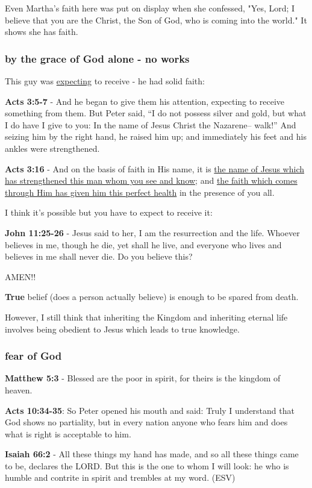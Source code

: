 \documentclass[11pt]{article}
\begin{document}
Even Martha's faith here was put on display when she confessed,
"Yes, Lord; I believe that you are the Christ, the Son of God, who is coming into the world."
It shows she has faith.

\subsubsection{by the grace of God alone - no works}
\label{sec:orgf0e6adc}
This guy was \uline{expecting} to receive - he had solid faith:

\textbf{Acts 3:5-7} - And he began to give them his attention, expecting to receive something from them. But Peter said, “I do not possess silver and gold, but what I do have I give to you: In the name of Jesus Christ the Nazarene-- walk!” And seizing him by the right hand, he raised him up; and immediately his feet and his ankles were strengthened.

\textbf{Acts 3:16} - And on the basis of faith in His name, it is \uline{the name of Jesus which has strengthened this man whom you see and know}; and \uline{the faith which comes through Him has given him this perfect health} in the presence of you all.

I think it's possible but you have to expect to receive it:

\textbf{John 11:25-26} - Jesus said to her, I am the resurrection and the life. Whoever believes in me, though he die, yet shall he live, and everyone who lives and believes in me shall never die. Do you believe this?

AMEN!!

\textbf{True} belief (does a person actually believe) is enough to be spared from death.

However, I still think that inheriting the Kingdom and inheriting eternal life involves being obedient to Jesus which leads to true knowledge.

\subsubsection{fear of God}
\label{sec:org84eb3ab}
\textbf{Matthew 5:3} - Blessed are the poor in spirit, for theirs is the kingdom of heaven.

\textbf{Acts 10:34-35}: So Peter opened his mouth and said: Truly I understand that God shows no partiality, but in every nation anyone who fears him and does what is right is acceptable to him.

\textbf{Isaiah 66:2} - All these things my hand has made, and so all these things came to be, declares the LORD. But this is the one to whom I will look: he who is humble and contrite in spirit and trembles at my word. (ESV)
\end{document}

